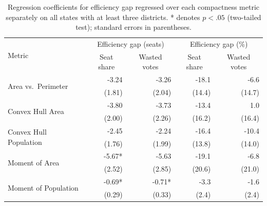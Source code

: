 \documentclass[12pt]{article}
\begin{document}
  \begin{table}
    \begin{center}
      \begin{tabular}{lrrrr}\toprule
        \multirow{2}{*}{Metric} & \multicolumn{2}{c}{Efficiency gap (seats)} & \multicolumn{2}{c}{Efficiency gap (\%)} \\
               & \multicolumn{1}{c}{Seat share} & \multicolumn{1}{c}{Wasted votes} & \multicolumn{1}{c}{Seat share} & \multicolumn{1}{c}{Wasted votes} \\\midrule
        \multirow{2}{*}{Area vs.~Perimeter} & -3.24 & -3.26 & -18.1 & -6.6 \\
        & (1.81) & (2.04) & (14.4) & (14.7) \\\midrule
        \multirow{2}{*}{Convex Hull Area} & -3.80 & -3.73 & -13.4 & 1.0 \\
        & (2.00) & (2.26) & (16.2) & (16.4) \\\midrule
        \multirow{2}{*}{Convex Hull Population} & -2.45 & -2.24 & -16.4 & -10.4 \\
        & (1.76) & (1.99) & (13.8) & (14.0) \\\midrule
        \multirow{2}{*}{Moment of Area} & -5.67* & -5.63 & -19.1 & -6.8 \\
        & (2.52) & (2.85) & (20.6) & (21.0) \\\midrule
        \multirow{2}{*}{Moment of Population} & -0.69* & -0.71* & -3.3 & -1.6 \\
        & (0.29) & (0.33) & (2.4) & (2.4) \\\bottomrule
      \end{tabular}
      \caption{Regression coefficients for efficiency gap regressed over each compactness metric separately on all states with at least three districts.  * denotes $p<.05$ (two-tailed test); standard errors in parentheses.\label{t:efficiency3}}
    \end{center}
  \end{table}
\end{document}
